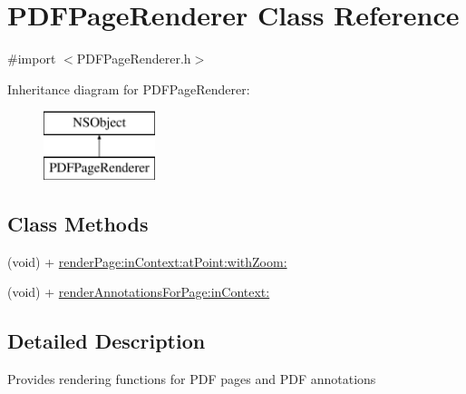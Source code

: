 \hypertarget{interface_p_d_f_page_renderer}{\section{P\-D\-F\-Page\-Renderer Class Reference}
\label{interface_p_d_f_page_renderer}
}


{\ttfamily \#import $<$P\-D\-F\-Page\-Renderer.\-h$>$}

Inheritance diagram for P\-D\-F\-Page\-Renderer\-:\begin{figure}[H]
\begin{center}
\leavevmode
\includegraphics[height=2.000000cm]{interface_p_d_f_page_renderer}
\end{center}
\end{figure}
\subsection*{Class Methods}
\begin{DoxyCompactItemize}
\item 
(void) + \hyperlink{interface_p_d_f_page_renderer_ae5ca0c5890ceaef655708727d05c0859}{render\-Page\-:in\-Context\-:at\-Point\-:with\-Zoom\-:}
\item 
(void) + \hyperlink{interface_p_d_f_page_renderer_a382dc31ceff20e3634a6233207f98a4e}{render\-Annotations\-For\-Page\-:in\-Context\-:}
\end{DoxyCompactItemize}


\subsection{Detailed Description}
Provides rendering functions for P\-D\-F pages and P\-D\-F annotations 

